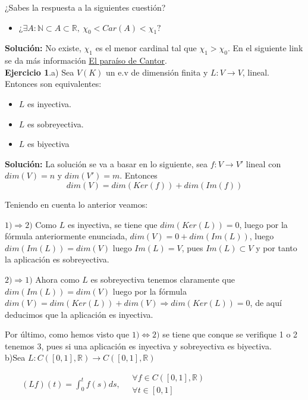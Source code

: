 \documentclass{article}
\begin{document}
\begin{enumerate}
¿Sabes la respuesta a la siguientes cuestión?
\begin{itemize}
\item ¿$\exists A:\mathbb{N}\subset A\subset \mathbb{R},\:\chi_0<Car(A)<\chi_1?$
\end{itemize}
\textbf{Solución:} No existe, $\chi_1$ es el menor cardinal tal que $\chi_1>\chi_0$. En el siguiente link se da más información \href{https://www.madrimasd.org/blogs/matematicas/tag/aleph-cero}{El paraíso de Cantor}.\\

\textbf{Ejercicio 1}.a) Sea $V(K)$ un e.v de dimensión finita y $L:V\rightarrow V$, lineal. Entonces son equivalentes:
\begin{itemize}
\item $L$ es inyectiva.
\item $L$ es sobreyectiva.
\item $L$ es biyectiva
\end{itemize}

\textbf{Solución:} La solución se va a basar en lo siguiente, sea $f:V\rightarrow V'$ lineal con $dim(V)=n$ y $dim(V')=m$. Entonces
\begin{equation*}
dim(V)=dim(Ker(f))+dim(Im(f))
\end{equation*}

Teniendo en cuenta lo anterior veamos:

$1)\Rightarrow 2)$ Como $L$ es inyectiva, se tiene que $dim(Ker(L))=0$, luego por la fórmula anteriormente enunciada, $dim(V)=0+dim(Im(L))$, luego $dim(Im(L))=dim(V)$ luego $Im(L)=V$, pues $Im(L)\subset V$ y por tanto la aplicación es sobreyectiva.

$2)\Rightarrow 1)$ Ahora como $L$ es sobreyectiva tenemos claramente que $dim(Im(L))=dim(V)$ luego por la fórmula $dim(V)=dim(Ker(L))+dim(V)\Rightarrow dim(Ker(L))=0$, de aquí deducimos que la aplicación es inyectiva.

Por último, como hemos visto que $1)\Leftrightarrow 2)$ se tiene que conque se verifique 1 o 2 tenemos 3, pues si una aplicación es inyectiva y sobreyectiva es biyectiva.\\


b)Sea $L:C([0,1],\mathbb{R})\rightarrow C([0,1],\mathbb{R})$

$\qquad (Lf)(t)=\int_0^t f(s)ds,\quad \left.\begin{array}{c}
\forall f\in C([0,1],\mathbb{R})\\
\forall t\in[0,1] 
\end{array}\right.$


\end{enumerate}
\end{document}
